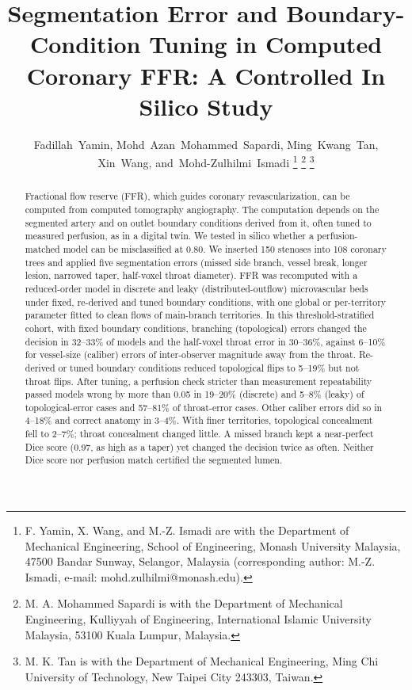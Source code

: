 \documentclass[journal,twoside,web]{ieeecolor}
\begin{document}

\title{Segmentation Error and Boundary-Condition Tuning in Computed Coronary FFR: A Controlled In Silico Study}

\author{Fadillah~Yamin,
        Mohd~Azan~Mohammed~Sapardi,
        Ming~Kwang~Tan,
        Xin~Wang,
        and~\mbox{Mohd-Zulhilmi~Ismadi}\endgraf\vspace{-\baselineskip}%
\thanks{F. Yamin, X. Wang, and M.-Z. Ismadi are with the Department of Mechanical Engineering, School of
Engineering, Monash University Malaysia, 47500 Bandar Sunway, Selangor, Malaysia (corresponding author:
M.-Z. Ismadi, e-mail: mohd.zulhilmi@monash.edu).}%
\thanks{M. A. Mohammed Sapardi is with the Department of Mechanical Engineering, Kulliyyah of Engineering,
International Islamic University Malaysia, 53100 Kuala Lumpur, Malaysia.}%
\thanks{M. K. Tan is with the Department of Mechanical Engineering, Ming Chi University of Technology, New Taipei
City 243303, Taiwan.}}


\maketitle

\begin{abstract}
Fractional flow reserve (FFR), which guides coronary revascularization, can be computed from computed tomography
angiography. The computation depends on the segmented artery and on outlet boundary conditions derived from it,
often tuned to measured perfusion, as in a digital twin. We tested in silico whether a perfusion-matched model can be
misclassified at 0.80. We inserted 150 stenoses into 108 coronary trees and applied five segmentation errors (missed side branch, vessel
break, longer lesion, narrowed taper, half-voxel throat diameter). FFR was recomputed with a reduced-order model in
discrete and leaky (distributed-outflow) microvascular beds under fixed, re-derived and tuned boundary conditions,
with one global or per-territory parameter fitted to clean flows of main-branch territories. In this threshold-stratified cohort, with fixed boundary conditions,
branching (topological) errors changed the decision in 32--33\% of models and the half-voxel throat error in
30--36\%, against 6--10\% for vessel-size (caliber) errors of inter-observer magnitude away from the throat.
Re-derived or tuned boundary conditions reduced topological flips to 5--19\% but not throat flips. After tuning, a perfusion check stricter than measurement repeatability passed models wrong by more than 0.05 in
19--20\% (discrete) and 5--8\% (leaky) of topological-error cases and 57--81\% of throat-error cases. Other caliber
errors did so in 4--18\% and correct anatomy in 3--4\%. With finer territories, topological concealment fell to
2--7\%; throat concealment changed little. A missed branch kept a near-perfect Dice score (0.97, as high as a taper) yet changed the decision twice as often.
Neither Dice score nor perfusion match certified the segmented lumen.
\end{abstract}
\end{document}
